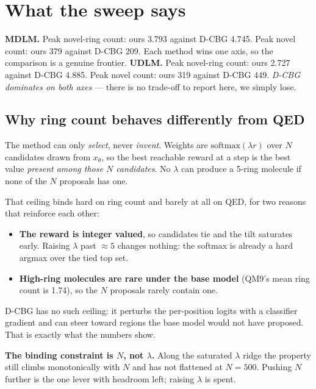 \documentclass[11pt]{article}
\begin{document}
\section{What the sweep says}
\textbf{MDLM.} Peak novel-ring count: ours 3.793 against D-CBG 4.745. Peak novel count: ours 379 against D-CBG 209. Each method wins one axis, so the comparison is a genuine frontier.
\textbf{UDLM.} Peak novel-ring count: ours 2.727 against D-CBG 4.885. Peak novel count: ours 319 against D-CBG 449. \emph{D-CBG dominates on both axes} --- there is no trade-off to report here, we simply lose.

\subsection{Why ring count behaves differently from QED}

The method can only \emph{select}, never \emph{invent}. Weights are
$\mathrm{softmax}(\lambda r)$ over $N$ candidates drawn from $x_\theta$, so the
best reachable reward at a step is the best value \emph{present among those $N$
candidates}. No $\lambda$ can produce a 5-ring molecule if none of the $N$
proposals has one.

That ceiling binds hard on ring count and barely at all on QED, for two reasons
that reinforce each other:

\begin{itemize}
  \item \textbf{The reward is integer valued}, so candidates tie and the tilt
        saturates early. Raising $\lambda$ past $\approx5$ changes nothing:
        the softmax is already a hard argmax over the tied top set.
  \item \textbf{High-ring molecules are rare under the base model} (QM9's mean
        ring count is 1.74), so the $N$ proposals rarely contain one.
\end{itemize}

D-CBG has no such ceiling: it perturbs the per-position logits with a classifier
gradient and can steer toward regions the base model would not have proposed.
That is exactly what the numbers show.

\textbf{The binding constraint is $N$, not $\lambda$.} Along the saturated
$\lambda$ ridge the property still climbs monotonically with $N$ and has not
flattened at $N=500$. Pushing $N$ further is the one lever with headroom left;
raising $\lambda$ is spent.
\end{document}
